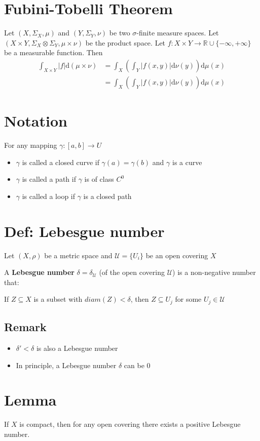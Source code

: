 \documentclass{book}
\newcommand{\abs}[1]{\left\lvert #1 \right\rvert}
\begin{document}
\section{Fubini-Tobelli Theorem}
Let $(X,\Sigma_X,\mu)$ and $(Y,\Sigma_Y,\nu)$ be two $\sigma$-finite measure spaces. Let $(X\times Y,\Sigma_X\otimes\Sigma_Y,\mu\times\nu)$ be the product space. Let $f:X\times Y\rightarrow \mathbb{R}\cup\{-\infty,+\infty\}$ be a measurable function. Then 
$$\begin{aligned}
    \int_{X\times Y}\abs{f}\text{d}(\mu\times\nu) &=\int_X(\int_Y\abs{f(x,y)}\text{d}\nu(y))\text{d}\mu(x)\\
    &=\int_X(\int_Y\abs{f(x,y)}\text{d}\nu(y))\text{d}\mu(x)
\end{aligned}$$
\section{Notation}
For any mapping $\gamma:[a,b]\rightarrow U$
\begin{itemize}
    \item $\gamma$ is called a closed curve if $\gamma(a)=\gamma(b)$ and $\gamma$ is a curve
    \item $\gamma$ is called a path if $\gamma$ is of class $C^0$
    \item $\gamma$ is called a loop if $\gamma$ is a closed path
\end{itemize}
\section{Def: Lebesgue number}
Let $(X,\rho)$ be a metric space and $\mathcal{U}=\{U_i\}$ be an open covering $X$

A \textbf{Lebesgue number} $\delta=\delta_{\mathcal{U}}$ (of the open covering $\mathcal{U}$) is a non-negative number that:

If $Z\subseteq X$ is a subset with $diam(Z)<\delta$, then $Z\subseteq U_j$ for some $U_j\in \mathcal{U}$
\subsection*{Remark}\begin{itemize}
    \item $\delta'<\delta$ is also a Lebesgue number
    \item In principle, a Lebesgue number $\delta$ can be 0
\end{itemize}
\section{Lemma} If $X$ is compact, then for any open covering there exists a positive Lebesgue number.
\end{document}
